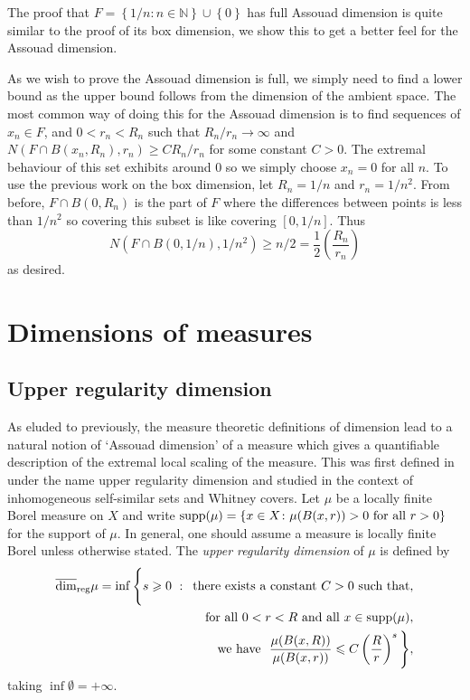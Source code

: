 The proof that $F=\left\{1/n \colon n \in \mathbb{N} \right\} \cup \left\{0 \right\}$ has full Assouad dimension is quite similar to the proof of its box dimension, we show this to get a better feel for the Assouad dimension.

As we wish to prove the Assouad dimension is full, we simply need to find a lower bound as the upper bound follows from the dimension of the ambient space. The most common way of doing this for the Assouad dimension is to find sequences of $x_n \in F$, and $0<r_n < R_n$ such that $R_n/r_n \rightarrow \infty$ and $N(F \cap B(x_n, R_n), r_n ) \ge CR_n/r_n$ for some constant $C>0$. The extremal behaviour of this set exhibits around 0 so we simply choose $x_n = 0$ for all $n$. To use the previous work on the box dimension, let $R_n = 1/n$ and $r_n = 1/n^2$. From before, $F\cap B(0,R_n)$ is the part of $F$ where the differences between points is less than $1/n^2$ so covering this subset is like covering $[0,1/n]$. Thus
\[
N(F \cap B(0, 1/n), 1/n^2 ) \ge n/2 = \frac{1}{2} \left( \frac{R_n}{r_n}\right)
\]
as desired.





\section{Dimensions of measures}
\label{sec:intro-measures}

\subsection{Upper regularity dimension}
\label{sec:intro-upper-reg}

As eluded to previously, the measure theoretic definitions of dimension lead to a natural notion of `Assouad dimension' of a measure which gives a quantifiable description of the extremal local scaling of the measure. This was first defined in \cite{anti1,anti2} under the name upper regularity dimension and studied in the context of inhomogeneous self-similar sets and Whitney covers. Let $\mu$ be a locally finite Borel measure on $X$ and write $\text{supp}(\mu) = \left\{ x \in X \colon \mu(B(x,r)) > 0 \textup{ for all } r > 0 \right\}$ for the support of $\mu$. In general, one should assume a measure is locally finite Borel unless otherwise stated. The \textit{upper regularity dimension} of $\mu$ is defined by 
\begin{align*} 
\overline{\dim}_{\textup{reg}} \mu = \inf \Bigg\{ s \geqslant 0 \, \,  : \,  \text{ there exists a  constant }C  > 0\text{  such that,} \\ \text{for all } 0< r< R  \text{  and all }x \in \text{supp} (\mu), \\ \text{we have }  \  \frac{\mu(B(x,R))}{\mu(B(x,r))} \leqslant C\left(\frac{R}{r}\right)^{s} \Bigg\},
\end{align*}
taking $\inf \emptyset = + \infty$. 

